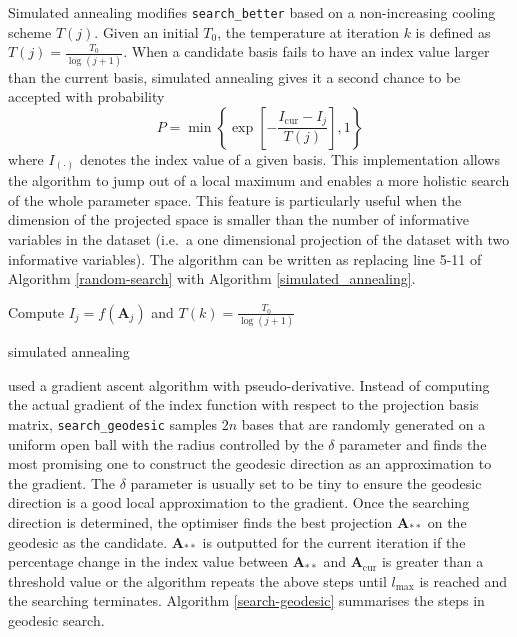 \documentclass[12pt]{article}
\begin{document}
Simulated annealing
\citep[\citet{bertsimas1993simulated}]{kirkpatrick1983optimization}
modifies \texttt{search\_better} based on a non-increasing cooling
scheme \(T(j)\). Given an initial \(T_0\), the temperature at iteration
\(k\) is defined as \(T(j) = \frac{T_0}{\log(j + 1)}\). When a candidate
basis fails to have an index value larger than the current basis,
simulated annealing gives it a second chance to be accepted with
probability
\[P= \min\left\{\exp\left[-\frac{I_{\text{cur}} - I_{j}}{T(j)}\right],1\right\}\]
where \(I_{(\cdot)}\) denotes the index value of a given basis. This
implementation allows the algorithm to jump out of a local maximum and
enables a more holistic search of the whole parameter space. This
feature is particularly useful when the dimension of the projected space
is smaller than the number of informative variables in the dataset
(i.e.~a one dimensional projection of the dataset with two informative
variables). The algorithm can be written as replacing line 5-11 of
Algorithm \ref{random-search} with Algorithm \ref{simulated_annealing}.

\begin{algorithm}
\SetAlgoLined
    Compute $I_{j} = f(\mathbf{A}_{j})$ and $T(k) = \frac{T_0}{\log(j + 1)}$\;
  \caption{simulated annealing}
  \label{simulated_annealing}
\end{algorithm}

\citet{cook1995grand} used a gradient ascent algorithm with
pseudo-derivative. Instead of computing the actual gradient of the index
function with respect to the projection basis matrix,
\texttt{search\_geodesic} samples \(2n\) bases that are randomly
generated on a uniform open ball with the radius controlled by the
\(\delta\) parameter and finds the most promising one to construct the
geodesic direction as an approximation to the gradient. The \(\delta\)
parameter is usually set to be tiny to ensure the geodesic direction is
a good local approximation to the gradient. Once the searching direction
is determined, the optimiser finds the best projection
\(\mathbf{A}_{**}\) on the geodesic as the candidate.
\(\mathbf{A}_{**}\) is outputted for the current iteration if the
percentage change in the index value between \(\mathbf{A}_{**}\) and
\(\mathbf{A}_{\text{cur}}\) is greater than a threshold value or the
algorithm repeats the above steps until \(l_{\max}\) is reached and the
searching terminates. Algorithm \ref{search-geodesic} summarises the
steps in geodesic search.
\end{document}
